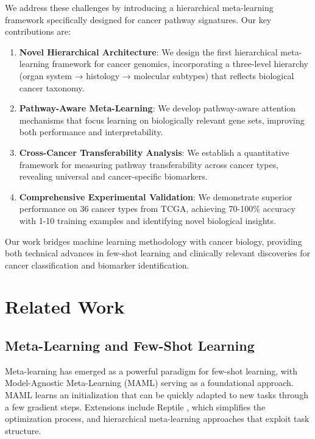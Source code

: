 \documentclass{article}
\begin{document}
We address these challenges by introducing a hierarchical meta-learning framework specifically designed for cancer pathway signatures. Our key contributions are:

\begin{enumerate}
\item \textbf{Novel Hierarchical Architecture}: We design the first hierarchical meta-learning framework for cancer genomics, incorporating a three-level hierarchy (organ system → histology → molecular subtypes) that reflects biological cancer taxonomy.

\item \textbf{Pathway-Aware Meta-Learning}: We develop pathway-aware attention mechanisms that focus learning on biologically relevant gene sets, improving both performance and interpretability.

\item \textbf{Cross-Cancer Transferability Analysis}: We establish a quantitative framework for measuring pathway transferability across cancer types, revealing universal and cancer-specific biomarkers.

\item \textbf{Comprehensive Experimental Validation}: We demonstrate superior performance on 36 cancer types from TCGA, achieving 70-100\% accuracy with 1-10 training examples and identifying novel biological insights.
\end{enumerate}

Our work bridges machine learning methodology with cancer biology, providing both technical advances in few-shot learning and clinically relevant discoveries for cancer classification and biomarker identification.

\section{Related Work}

\subsection{Meta-Learning and Few-Shot Learning}

Meta-learning has emerged as a powerful paradigm for few-shot learning, with Model-Agnostic Meta-Learning (MAML) \cite{finn2017model} serving as a foundational approach. MAML learns an initialization that can be quickly adapted to new tasks through a few gradient steps. Extensions include Reptile \cite{nichol2018first}, which simplifies the optimization process, and hierarchical meta-learning approaches \cite{grant2018recasting} that exploit task structure.
\end{document}
